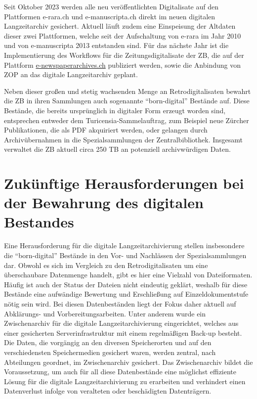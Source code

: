 \documentclass[a4paper,
fontsize=11pt,
oneside,
numbers=noperiodatend,
parskip=half-,
bibliography=totoc,
final
]{scrartcl}
\begin{document}
Seit Oktober 2023 werden alle neu veröffentlichten Digitalisate auf den
Plattformen e-rara.ch und e-manuscripta.ch direkt im neuen digitalen
Langzeitarchiv gesichert. Aktuell läuft zudem eine Einspeisung der
Altdaten dieser zwei Plattformen, welche seit der Aufschaltung von
e-rara im Jahr 2010 und von e-manuscripta 2013 entstanden sind. Für das
nächste Jahr ist die Implementierung des Workflows für die
Zeitungsdigitalisate der ZB, die auf der Plattform
\href{http://e-newspaperarchives.ch}{e-newspaperarchives.ch} publiziert
werden, sowie die Anbindung von ZOP an das digitale Langzeitarchiv
geplant.

Neben dieser großen und stetig wachsenden Menge an Retrodigitalisaten
bewahrt die ZB in ihren Sammlungen auch sogenannte
\enquote{born-digital} Bestände auf. Diese Bestände, die bereits
ursprünglich in digitaler Form erzeugt worden sind, entsprechen entweder
dem Turicensia-Sammelauftrag, zum Beispiel neue Zürcher Publikationen,
die als PDF akquiriert werden, oder gelangen durch Archivübernahmen in
die Spezialsammlungen der Zentralbibliothek. Insgesamt verwaltet die ZB
aktuell circa 250 TB an potenziell archivwürdigen Daten.

\section{Zukünftige Herausforderungen bei der Bewahrung des
digitalen
Bestandes}\label{zukuxfcnftige-herausforderungen-bei-der-bewahrung-des-digitalen-bestandes}

Eine Herausforderung für die digitale Langzeitarchivierung stellen
insbesondere die \enquote{born-digital} Bestände in den Vor- und
Nachlässen der Spezialsammlungen dar. Obwohl es sich im Vergleich zu den
Retrodigitalisaten um eine überschaubare Datenmenge handelt, gibt es
hier eine Vielzahl von Dateiformaten. Häufig ist auch der Status der
Dateien nicht eindeutig geklärt, weshalb für diese Bestände eine
aufwändige Bewertung und Erschließung auf Einzeldokumentstufe nötig sein
wird. Bei diesen Datenbeständen liegt der Fokus daher aktuell auf
Abklärungs- und Vorbereitungsarbeiten. Unter anderem wurde ein
Zwischenarchiv für die digitale Langzeitarchivierung eingerichtet,
welches aus einer gesicherten Serverinfrastruktur mit einem regelmäßigen
Back-up besteht. Die Daten, die vorgängig an den diversen Speicherorten
und auf den verschiedensten Speichermedien gesichert waren, werden
zentral, nach Abteilungen geordnet, im Zwischenarchiv gesichert. Das
Zwischenarchiv bildet die Voraussetzung, um auch für all diese
Datenbestände eine möglichst effiziente Lösung für die digitale
Langzeitarchivierung zu erarbeiten und verhindert einen Datenverlust
infolge von veralteten oder beschädigten Datenträgern.
\end{document}
